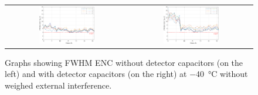 \begin{figure}[h!]
    \centering
    \begin{tabular}{cc}
         \includegraphics[width=0.475\textwidth]{Images/chap1/results/ENC_minus40C/ASIC_cold_wocaps_wo_fit.pdf} &  \includegraphics[width=0.475\textwidth]{Images/chap1/results/ENC_minus40C/ASIC_cold_wcaps_wo_fit.pdf} \\
    \end{tabular}
    \caption{Graphs showing FWHM ENC without detector capacitors (on the left) and with detector capacitors (on the right) at \SI{-40}{\celsius} without weighed external interference.}
    \label{figENCwofit}
\end{figure}